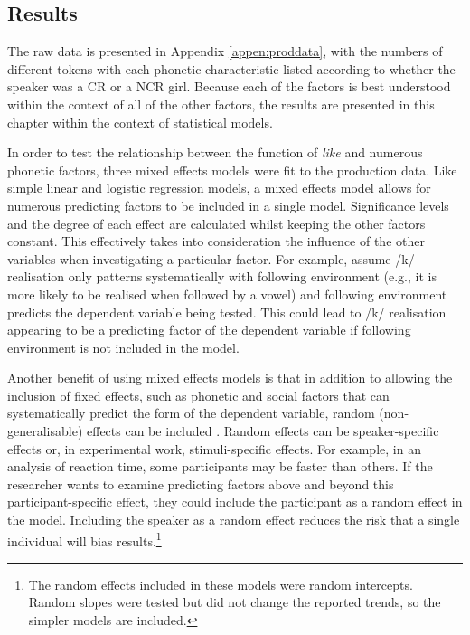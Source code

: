\subsection{Results}\label{sec:prodresults}

The raw data is presented in Appendix \ref{appen:proddata}, with the numbers of different tokens with each phonetic characteristic listed according to whether the speaker was a CR or a NCR girl.  Because each of the factors is best understood within the context of all of the other factors, the results are presented in this chapter within the context of statistical models.

In order to test the relationship between the function of \textit{like} and numerous phonetic factors, three mixed effects models were fit to the production data.  Like simple linear and logistic regression models, a mixed effects model allows for numerous predicting factors to be included in a single model.  Significance levels and the degree of each effect are calculated whilst keeping the other factors constant.  This effectively takes into consideration the influence of the other variables when investigating a particular factor.  For example, assume /k/ realisation only patterns systematically with following environment (e.g., it is more likely to be realised when followed by a vowel) and following environment predicts the dependent variable being tested.  This could lead to /k/ realisation appearing to be a predicting factor of the dependent variable if following environment is not included in the model. 

Another benefit of using mixed effects models is that in addition to allowing the inclusion of fixed effects, such as phonetic and social factors that can systematically predict the form of the dependent variable, random (non-generalisable) effects can be included \cite[263-326]{baayen2008}.    Random effects can be speaker-specific effects or, in experimental work, stimuli-specific effects.  For example, in an analysis of reaction time, some participants may be faster than others.  If the researcher wants to examine predicting factors above and beyond this participant-specific effect, they could include the participant as a random effect in the model.   Including the speaker as a random effect reduces the risk that a single individual will bias results.\footnote{The random effects included in these models were random intercepts.  Random slopes were tested but did not change the reported trends, so the simpler models are included.} 


